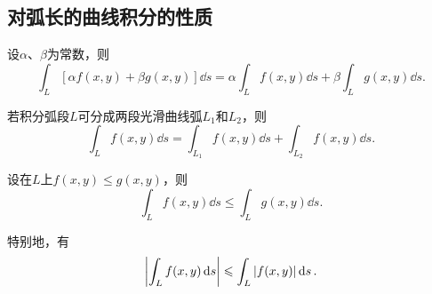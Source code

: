 \subsection{对弧长的曲线积分的性质}
\begin{property}\label{theorem:线积分与面积分.第一类曲线积分性质1}
设\(\alpha\)、\(\beta\)为常数，则\[
\int_L [\alpha f(x,y) + \beta g(x,y)] \dd{s}
= \alpha \int_L f(x,y) \dd{s}
+ \beta \int_L g(x,y) \dd{s}.
\]
\end{property}

\begin{property}\label{theorem:线积分与面积分.第一类曲线积分性质2}
若积分弧段\(L\)可分成两段光滑曲线弧\(L_1\)和\(L_2\)，则\[
\int_L f(x,y) \dd{s}
=\int_{L_1} f(x,y) \dd{s}
+\int_{L_2} f(x,y) \dd{s}.
\]
\end{property}

\begin{property}\label{theorem:线积分与面积分.第一类曲线积分性质3}
设在\(L\)上\(f(x,y) \leqslant g(x,y)\)，则\[
\int_L f(x,y) \dd{s}
\leqslant
\int_L g(x,y) \dd{s}.
\]

特别地，有\[
\abs{\int_L f(x,y) \dd{s}} \leqslant \int_L \abs{f(x,y)} \dd{s}.
\]
\end{property}

